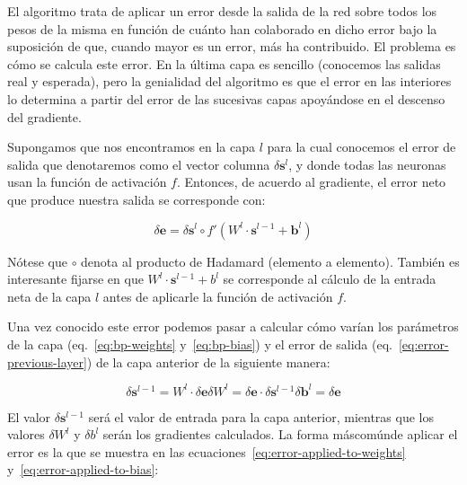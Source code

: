 El algoritmo trata de aplicar un error desde la salida de la red sobre todos los pesos de la misma en función de cuánto han colaborado en dicho error bajo la suposición de que, cuando mayor es un error, más ha contribuido. El problema es cómo se calcula este error. En la última capa es sencillo (conocemos las salidas real y esperada), pero la genialidad del algoritmo es que el error en las interiores lo determina a partir del error de las sucesivas capas apoyándose en el descenso del gradiente.

Supongamos que nos encontramos en la capa $l$ para la cual conocemos el error de salida que denotaremos como el vector columna $\delta \mathbf{s}^l$, y donde todas las neuronas usan la función de activación $f$. Entonces, de acuerdo al gradiente, el error neto que produce nuestra salida se corresponde con:

\begin{equation}
	\delta \mathbf{e} = \delta \mathbf{s}^l \circ f'(W^l \cdot \mathbf{s}^{l-1} + \mathbf{b}^l)
\end{equation}

Nótese que $\circ$ denota al producto de Hadamard (elemento a elemento). También es interesante fijarse en que $W^l \cdot \mathbf{s}^{l-1} + b^l$ se corresponde al cálculo de la entrada neta de la capa $l$ antes de aplicarle la función de activación $f$.

Una vez conocido este error podemos pasar a calcular cómo varían los parámetros de la capa (eq.~\ref{eq:bp-weights} y~\ref{eq:bp-bias}) y el error de salida (eq.~\ref{eq:error-previous-layer}) de la capa anterior de la siguiente manera:

\begin{subequations}
	\begin{equation}
		\delta \mathbf{s}^{l-1} = W^{l} \cdot \delta \mathbf{e} \label{eq:error-previous-layer}
	\end{equation}
	\begin{equation}
		\delta W^l = \delta \mathbf{e} \cdot \delta \mathbf{s}^{l-1} \label{eq:bp-weights}
	\end{equation}
	\begin{equation}
		\delta \mathbf{b}^l = \delta \mathbf{e} \label{eq:bp-bias}
	\end{equation}
\end{subequations}

El valor $\delta \mathbf{s}^{l-1}$ será el valor de entrada para la capa anterior, mientras que los valores $\delta W^l$ y $\delta b^l$ serán los gradientes calculados. La forma máscomúnde aplicar el error es la que se muestra en las ecuaciones~\ref{eq:error-applied-to-weights} y~\ref{eq:error-applied-to-bias}:

